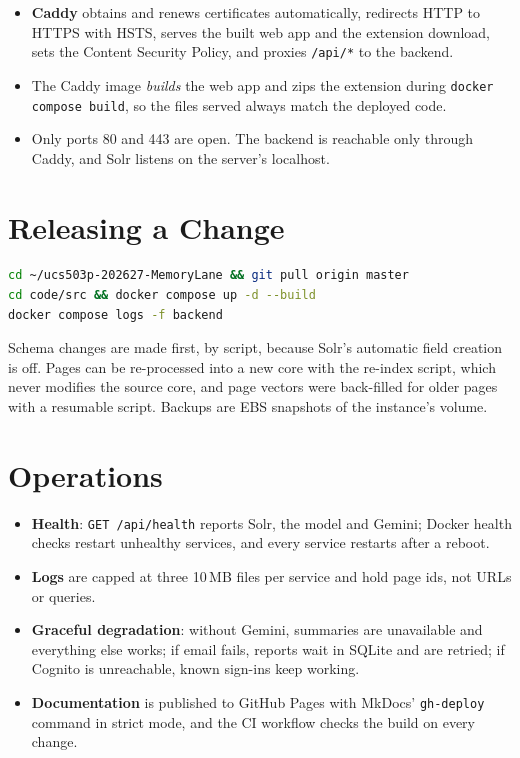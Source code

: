 \begin{itemize}
  \item \textbf{Caddy} \cite{caddy} obtains and renews certificates
  automatically, redirects HTTP to HTTPS with HSTS, serves the built web app
  and the extension download, sets the Content Security Policy, and proxies
  \texttt{/api/*} to the backend.
  \item The Caddy image \emph{builds} the web app and zips the extension
  during \texttt{docker compose build}, so the files served always match the
  deployed code.
  \item Only ports 80 and 443 are open. The backend is reachable only
  through Caddy, and Solr listens on the server's localhost.
\end{itemize}

\section{Releasing a Change}

\begin{lstlisting}[language=bash]
cd ~/ucs503p-202627-MemoryLane && git pull origin master
cd code/src && docker compose up -d --build
docker compose logs -f backend
\end{lstlisting}

Schema changes are made first, by script, because Solr's automatic field
creation is off. Pages can be re-processed into a new core with the re-index
script, which never modifies the source core, and page vectors were
back-filled for older pages with a resumable script. Backups are EBS
snapshots of the instance's volume.

\section{Operations}

\begin{itemize}
  \item \textbf{Health}: \texttt{GET /api/health} reports Solr, the model and
  Gemini; Docker health checks restart unhealthy services, and every
  service restarts after a reboot.
  \item \textbf{Logs} are capped at three 10\,MB files per service and hold
  page ids, not URLs or queries.
  \item \textbf{Graceful degradation}: without Gemini, summaries are
  unavailable and everything else works; if email fails, reports wait in
  SQLite and are retried; if Cognito is unreachable, known sign-ins keep
  working.
  \item \textbf{Documentation} is published to GitHub Pages with MkDocs'
  \texttt{gh-deploy} command in strict mode, and the CI workflow checks the
  build on every change.
\end{itemize}
